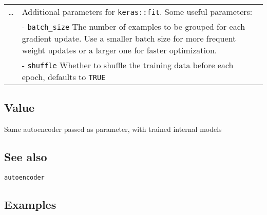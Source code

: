 \begin{longtable}[c]{@{}ll@{}}
\begin{minipage}[t]{0.09\columnwidth}\raggedright\strut
\ldots{}
\strut\end{minipage} &
\begin{minipage}[t]{0.84\columnwidth}\raggedright\strut
Additional parameters for \texttt{keras::fit}. Some useful parameters:
\strut\end{minipage}\tabularnewline
\begin{minipage}[t]{0.09\columnwidth}\raggedright\strut
\strut\end{minipage} &
\begin{minipage}[t]{0.84\columnwidth}\raggedright\strut
- \texttt{batch\_size} The number of examples to be grouped for each
gradient update. Use a smaller batch size for more frequent weight
updates or a larger one for faster optimization.
\strut\end{minipage}\tabularnewline
\begin{minipage}[t]{0.09\columnwidth}\raggedright\strut
\strut\end{minipage} &
\begin{minipage}[t]{0.84\columnwidth}\raggedright\strut
- \texttt{shuffle} Whether to shuffle the training data before each
epoch, defaults to \texttt{TRUE}
\strut\end{minipage}\tabularnewline
\bottomrule
\end{longtable}

\hypertarget{value}{\subsection{\texorpdfstring{\protect\hyperlink{value}{}Value}{Value}}\label{value}}

Same autoencoder passed as parameter, with trained internal models

\hypertarget{see-also}{\subsection{\texorpdfstring{\protect\hyperlink{see-also}{}See
also}{See also}}\label{see-also}}

\texttt{autoencoder}

\hypertarget{examples}{\subsection{\texorpdfstring{\protect\hyperlink{examples}{}Examples}{Examples}}\label{examples}}


